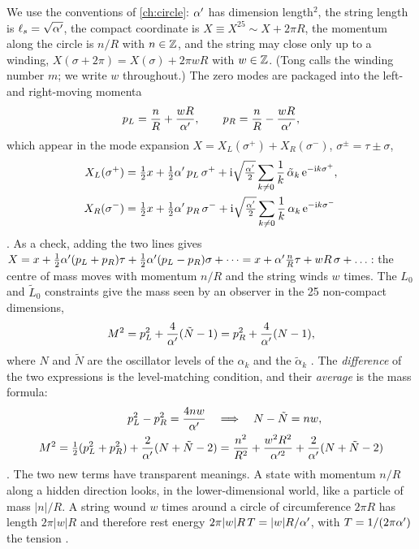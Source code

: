 We use the conventions of \cref{ch:circle}: $\alpha'$ has dimension length$^2$, the string
length is $\ell_s=\sqrt{\alpha'}$, the compact coordinate is $X\equiv X^{25}\sim X+2\pi R$, the
momentum along the circle is $n/R$ with $n\in\mathbb{Z}$, and the string may close only up to a winding,
$X(\sigma+2\pi)=X(\sigma)+2\pi wR$ with $w\in\mathbb{Z}$. (Tong calls the winding number $m$; we write $w$
throughout.) The zero modes are packaged into the left- and right-moving momenta
\begin{equation}\label{eq:tduality:pLpR}
  p_L=\frac nR+\frac{wR}{\alpha'},\qquad p_R=\frac nR-\frac{wR}{\alpha'},
\end{equation}
which appear in the mode expansion $X=X_L(\sigma^+)+X_R(\sigma^-)$, $\sigma^\pm=\tau\pm\sigma$,
\begin{equation}\label{eq:tduality:modes}
\begin{aligned}
  X_L(\sigma^+)&=\tfrac12x+\tfrac12\alpha'\,p_L\,\sigma^+
     +\mathrm{i}\sqrt{\tfrac{\alpha'}{2}}\sum_{k\ne0}\frac1k\,\tilde\alpha_k\,\mathrm{e}^{-\mathrm{i} k\sigma^+},\\
  X_R(\sigma^-)&=\tfrac12x+\tfrac12\alpha'\,p_R\,\sigma^-
     +\mathrm{i}\sqrt{\tfrac{\alpha'}{2}}\sum_{k\ne0}\frac1k\,\alpha_k\,\mathrm{e}^{-\mathrm{i} k\sigma^-}
\end{aligned}
\end{equation}
. As a check, adding the two lines gives
$X=x+\frac12\alpha'(p_L+p_R)\tau+\frac12\alpha'(p_L-p_R)\sigma+\dots=x+\alpha'\frac nR\tau+wR\,\sigma+\dots$: the
centre of mass moves with momentum $n/R$ and the string winds $w$ times. The $L_0$ and
$\tilde L_0$ constraints give the mass seen by an observer in the 25 non-compact dimensions,
\begin{equation}\label{eq:tduality:M2LR}
  M^2=p_L^2+\frac4{\alpha'}(\tilde N-1)=p_R^2+\frac4{\alpha'}(N-1),
\end{equation}
where $N$ and $\tilde N$ are the oscillator levels of the $\alpha_k$ and the $\tilde\alpha_k$
. The \emph{difference} of the two expressions is the
level-matching condition, and their \emph{average} is the mass formula:
\begin{align}
  p_L^2-p_R^2=\frac{4nw}{\alpha'}\quad&\Longrightarrow\quad N-\tilde N=nw,
     \label{eq:tduality:level}\\
  M^2=\tfrac12(p_L^2+p_R^2)+\frac2{\alpha'}(N+\tilde N-2)
     &=\frac{n^2}{R^2}+\frac{w^2R^2}{\alpha'^2}+\frac2{\alpha'}(N+\tilde N-2)
     \label{eq:tduality:M2}
\end{align}
. The two new terms have transparent
meanings. A state with momentum $n/R$ along a hidden direction looks, in the lower-dimensional
world, like a particle of mass $|n|/R$. A string wound $w$ times around a circle of circumference
$2\pi R$ has length $2\pi|w|R$ and therefore rest energy $2\pi|w|R\,T=|w|R/\alpha'$, with
$T=1/(2\pi\alpha')$ the tension .

